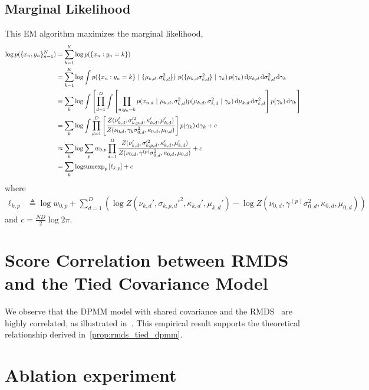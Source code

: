 \subsection{Marginal Likelihood}
This EM algorithm maximizes the marginal likelihood,
\begin{align*}
    \log p(\{x_n, y_n\}_{n=1}^N)
    &= \sum_{k=1}^K \log p(\{x_n: y_n =k\})  \\
    &= \sum_{k=1}^K \log \int p(\{x_n: y_n=k\} ~\vert~ \{\mu_{k,d}, \sigma_{k,d}^2\}) \ p(\{\mu_{k,d} \sigma_{k,d}^2\} ~\vert~ \gamma_k) \, p(\gamma_k) \mathop{}\!\mathrm{d} \mu_{k,d} \mathop{}\!\mathrm{d} \sigma_{k,d}^2 \mathop{}\!\mathrm{d} \gamma_k \\
    &= \sum_k \log \int \left[ \prod_{d=1}^D \int \left[ \prod_{n:y_n=k} p(x_{n,d} ~\vert~ \mu_{k,d}, \sigma_{k,d}^2) p(\mu_{k,d}, \sigma_{k,d}^2 ~\vert~ \gamma_k) \mathop{}\!\mathrm{d} \mu_{k,d} \mathop{}\!\mathrm{d} \sigma_{k,d}^2 \right] p(\gamma_k) \mathop{}\!\mathrm{d} \gamma_k \right] \\
    &= \sum_k \log \int \prod_{d=1}^D \left[\frac{Z(\nu_{k,d}', \sigma_{k,p,d}'^2, \kappa_{k,d}', \mu_{k,d}')}{Z(\nu_{0,d}, \gamma_k \sigma_{0,d}^2, \kappa_{0,d}, \mu_{0,d})} \right] p(\gamma_k) \mathop{}\!\mathrm{d} \gamma_k + c \\
    &\approx \sum_k \log \sum_p w_{0,p} \prod_{d=1}^D \frac{Z(\nu_{k,d}', \sigma_{k,p,d}'^2, \kappa_{k,d}', \mu_{k,d}')}{Z(\nu_{0,d}, \gamma^{(p)} \sigma_{0,d}^2, \kappa_{0,d}, \mu_{0,d})}  + c \\
    &= \sum_k \mathrm{logsumexp}_p \left[ \ell_{k,p} \right] + c
\end{align*}
where
\begin{align*}
    \ell_{k,p}
    &\triangleq \log w_{0,p} + \sum_{d=1}^D \left(\log Z(\nu_{k,d}', \sigma_{k,p,d}'^2, \kappa_{k,d}', \mu_{k,d}') - \log Z(\nu_{0,d}, \gamma^{(p)} \sigma_{0,d}^2, \kappa_{0,d}, \mu_{0,d}) \right)
\end{align*}
and $c = \tfrac{ND}{2} \log 2\pi$.
\clearpage

\section{Score Correlation between RMDS and the Tied Covariance Model}
\label{app:rmds_dpmm_corr}
We observe that the DPMM model with shared covariance and the RMDS~\cite{ren21rmds} are highly correlated, as illustrated in~.
This empirical result supports the theoretical relationship derived in~\cref{prop:rmds_tied_dpmm}.


\clearpage
\section{Ablation experiment}
\label{app:ablation}

